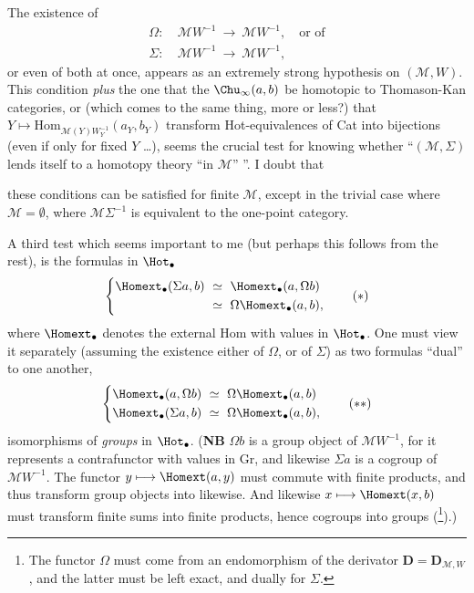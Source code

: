 
The existence of
\[
\begin{aligned}
\Omega :\ & \mathcal{M}W^{-1} \ \longrightarrow\ \mathcal{M}W^{-1}, \quad \text{or of}\\
\Sigma :\ & \mathcal{M}W^{-1} \ \longrightarrow\ \mathcal{M}W^{-1},
\end{aligned}
\]
or even of both at once, appears as an extremely strong hypothesis  on $(\mathcal{M}, W)$. This condition \textit{plus} the one  that the $\Chu_{\infty}(a,b)$ be homotopic to Thomason-Kan categories, or (which comes to the same thing, more or less?) that $Y \longmapsto \mathrm{Hom}_{\mathcal{M}(Y)W_Y^{-1}}(a_Y, b_Y)$ transform Hot-equivalences of Cat into bijections (even if only for fixed $Y$ \dots), seems the crucial test for knowing whether ``$(\mathcal{M}, \Sigma)$ lends itself to a homotopy theory ``in $\mathcal{M}$'' ''. I doubt that


these conditions can be satisfied for finite $\mathcal{M}$, except in the trivial case where $\mathcal{M} = \emptyset$, where $\mathcal{M}\Sigma^{-1}$ is equivalent to the one-point category.

A third test  which seems important to me (but perhaps this follows from the rest), is the formulas in $\Hot_\bullet$
\[
\left\{
\begin{aligned}
\Homext_\bullet(\Sigma a, b) \ &\simeq\ \Homext_\bullet(a, \Omega b)\\
&\simeq\ \Omega\Homext_\bullet(a, b),
\end{aligned}
\right.
\tag*{$(*)$}
\]
where $\Homext_\bullet$ denotes the external Hom with values in $\Hot_\bullet$. One must view it separately (assuming the existence either of $\Omega$, or of $\Sigma$) as two formulas ``dual'' to one another,
\[
\left\{
\begin{aligned}
\Homext_\bullet(a, \Omega b) \ &\simeq\ \Omega\Homext_\bullet(a, b)\\
\Homext_\bullet(\Sigma a, b) \ &\simeq\ \Omega\Homext_\bullet(a, b),
\end{aligned}
\right.
\tag*{$(**)$}
\]
isomorphisms of \textit{groups} in $\Hot_\bullet$. (\textbf{NB} $\Omega b$ is a group object of $\mathcal{M}W^{-1}$, for it represents a contrafunctor with values in Gr, and likewise $\Sigma a$ is a cogroup of $\mathcal{M}W^{-1}$. The functor $y \longmapsto \Homext(a, y)$ must commute with finite products, and thus transform group objects into likewise. And likewise $x \longmapsto \Homext(x, b)$ must transform finite sums into finite products, hence cogroups into groups (\footnote[8]{The functor $\Omega$ must come from an endomorphism of the derivator $\mathbf{D} = \mathbf{D}_{\mathcal{M},W}$, and the latter must be left exact, and dually for $\Sigma$.}).)

